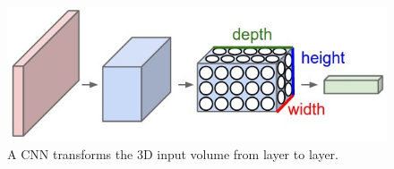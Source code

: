 \begin{figure}[h!]
  \includegraphics[width=\linewidth]{img/cnn.jpeg}
  \caption{\small A CNN transforms the 3D input volume from layer to layer.}
  \label{fig:3DVolume}
\end{figure}

